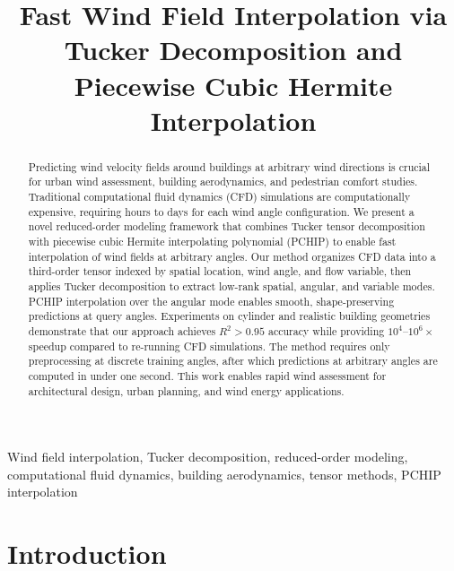 \documentclass[conference]{IEEEtran}
\begin{document}
\title{Fast Wind Field Interpolation via Tucker Decomposition and Piecewise Cubic Hermite Interpolation}

\author{
}

\maketitle

\begin{abstract}
Predicting wind velocity fields around buildings at arbitrary wind directions is crucial for urban wind assessment, building aerodynamics, and pedestrian comfort studies. Traditional computational fluid dynamics (CFD) simulations are computationally expensive, requiring hours to days for each wind angle configuration. We present a novel reduced-order modeling framework that combines Tucker tensor decomposition with piecewise cubic Hermite interpolating polynomial (PCHIP) to enable fast interpolation of wind fields at arbitrary angles. Our method organizes CFD data into a third-order tensor indexed by spatial location, wind angle, and flow variable, then applies Tucker decomposition to extract low-rank spatial, angular, and variable modes. PCHIP interpolation over the angular mode enables smooth, shape-preserving predictions at query angles. Experiments on cylinder and realistic building geometries demonstrate that our approach achieves $R^2 > 0.95$ accuracy while providing $10^4$--$10^6\times$ speedup compared to re-running CFD simulations. The method requires only preprocessing at discrete training angles, after which predictions at arbitrary angles are computed in under one second. This work enables rapid wind assessment for architectural design, urban planning, and wind energy applications.
\end{abstract}

\begin{IEEEkeywords}
Wind field interpolation, Tucker decomposition, reduced-order modeling, computational fluid dynamics, building aerodynamics, tensor methods, PCHIP interpolation
\end{IEEEkeywords}

\section{Introduction}
\end{document}
